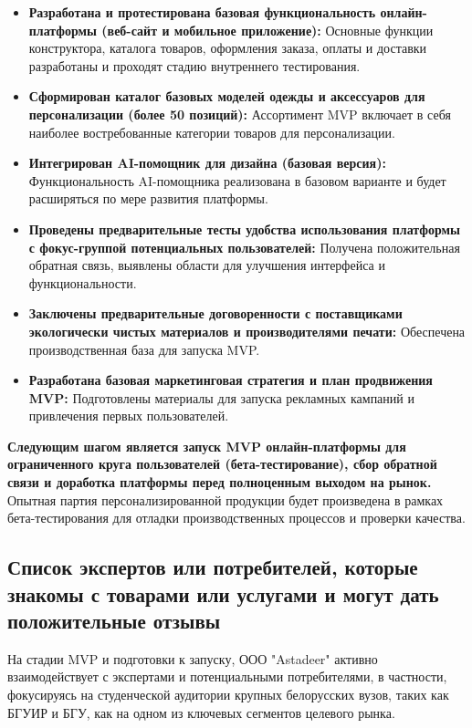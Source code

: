 \begin{itemize}
    \item \textbf{Разработана и протестирована базовая функциональность онлайн-платформы (веб-сайт и мобильное приложение):}  Основные функции конструктора, каталога товаров, оформления заказа, оплаты и доставки разработаны и проходят стадию внутреннего тестирования.
    \item \textbf{Сформирован каталог базовых моделей одежды и аксессуаров для персонализации (более 50 позиций):}  Ассортимент MVP включает в себя наиболее востребованные категории товаров для персонализации.
    \item \textbf{Интегрирован AI-помощник для дизайна (базовая версия):}  Функциональность AI-помощника реализована в базовом варианте и будет расширяться по мере развития платформы.
    \item \textbf{Проведены предварительные тесты удобства использования платформы с фокус-группой потенциальных пользователей:}  Получена положительная обратная связь, выявлены области для улучшения интерфейса и функциональности.
    \item \textbf{Заключены предварительные договоренности с поставщиками экологически чистых материалов и производителями печати:}  Обеспечена производственная база для запуска MVP.
    \item \textbf{Разработана базовая маркетинговая стратегия и план продвижения MVP:}  Подготовлены материалы для запуска рекламных кампаний и привлечения первых пользователей.
\end{itemize}

\vspace{0.3cm}

\textbf{Следующим шагом является запуск MVP онлайн-платформы для ограниченного круга пользователей (бета-тестирование), сбор обратной связи и доработка платформы перед полноценным выходом на рынок.}  Опытная партия персонализированной продукции будет произведена в рамках бета-тестирования для отладки производственных процессов и проверки качества.

\subsection{Список экспертов или потребителей, которые знакомы с товарами или услугами и могут дать положительные отзывы}

На стадии MVP и подготовки к запуску, ООО "Astadeer" активно взаимодействует с экспертами и потенциальными потребителями, в частности, фокусируясь на студенческой аудитории крупных белорусских вузов, таких как БГУИР и БГУ, как на одном из ключевых сегментов целевого рынка.

